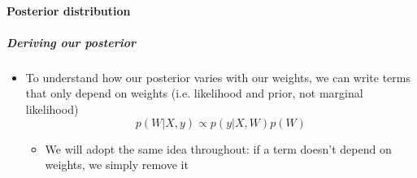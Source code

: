 \documentclass[12pt]{article}
\begin{document}
\paragraph{Posterior distribution}

\subparagraph{Deriving our posterior}
\begin{itemize}
    \item To understand how our posterior varies with our weights, we can write terms that only depend on weights (i.e. likelihood and prior, not marginal likelihood)
\begin{equation}
    p(W|X, y) \propto p(y|X,W)p(W)
\end{equation}
     \begin{itemize}
         \item We will adopt the same idea throughout: if a term doesn't depend on weights, we simply remove it
     \end{itemize}


\end{itemize}
\end{document}
